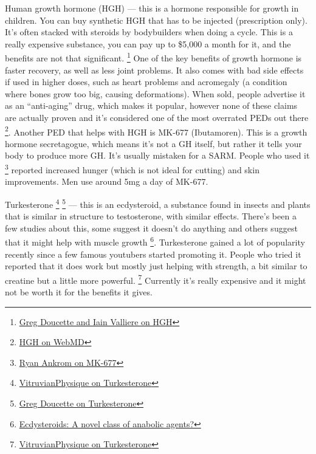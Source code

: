\documentclass[openany, 12pt]{book}
\begin{document}
        Human growth hormone (HGH) --- this is a hormone responsible for growth in children. You can buy synthetic HGH that has to be injected (prescription only). 
        It's often stacked with steroids by bodybuilders when doing a cycle.
        This is a really expensive substance, you can pay up to \$5,000 a month for it, and the benefits are not that significant.
        \footnote{\href{https://www.youtube.com/watch?v=5F7m8RHf2ZA/}{Greg Doucette and Iain Valliere on HGH}}
        One of the key benefits of growth hormone is faster recovery, as well as less joint problems.
        It also comes with bad side effects if used in higher doses, such as heart problems and acromegaly (a condition where bones grow too big, causing deformations).
        When sold, people advertise it as an ``anti-aging'' drug, which makes it popular, however none of these claims are actually proven and it's considered one of the
        most overrated PEDs out there
        \footnote{\href{https://www.webmd.com/fitness-exercise/human-growth-hormone-hgh}{HGH on WebMD}}. Another PED that helps with HGH is
        MK-677 (Ibutamoren). This is a growth hormone secretagogue, which means it's not a GH itself, but rather it tells your body to produce more GH. It's usually mistaken
        for a SARM. People who used it
        \footnote{\href{https://www.youtube.com/watch?v=sXNnRQh4grU}{Ryan Ankrom on MK-677}}
        reported increased hunger (which is not ideal for cutting) and skin improvements. Men use around 5mg a day of MK-677.

        Turkesterone
        \footnote{\href{https://www.youtube.com/watch?v=zwlHwlOLW9Q}{VitruvianPhysique on Turkesterone}}
        \footnote{\href{https://www.youtube.com/watch?v=T2QKWjEYZqY}{Greg Doucette on Turkesterone}}
        --- this is an ecdysteroid, a substance found in insects and plants that is similar in structure to testosterone, with similar effects. There's been a few studies about this,
        some suggest it doesn't do anything and others suggest that it might help with muscle growth
        \footnote{\href{https://www.ncbi.nlm.nih.gov/pmc/articles/PMC4447764/}{Ecdysteroids: A novel class of anabolic agents?}}.
        Turkesterone gained a lot of popularity recently since a few famous youtubers started promoting it.
        People who tried it reported that it does work but mostly just helping with strength, a bit similar to creatine but a little more powerful.
        \footnote{\href{https://www.youtube.com/watch?v=zwlHwlOLW9Q}{VitruvianPhysique on Turkesterone}}
        Currently it's really expensive and it might not be worth it for the benefits it gives.
\end{document}
